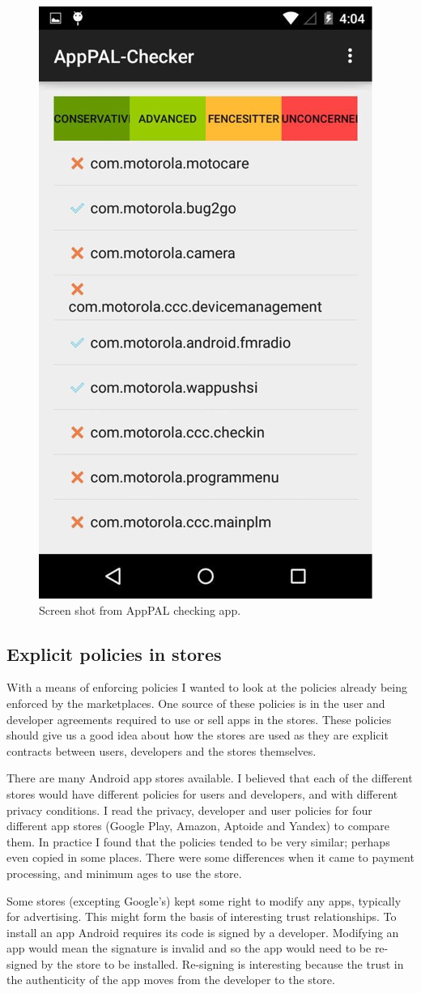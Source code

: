 \documentclass[a4paper]{scrartcl}
\begin{document}
\begin{figure}[]
  \centering
  \includegraphics[width=0.5\linewidth]{images/apppal-checker.png}
  \caption{Screen shot from AppPAL checking app.}
  \label{fig:checker}
\end{figure}
\subsection{Explicit policies in stores}

With a means of enforcing policies I wanted to look at the policies already being enforced by the marketplaces.
One source of these policies is in the user and developer agreements required to use or sell apps in the stores.
These policies should give us a good idea about how the stores are used as they are explicit contracts between users, developers and the stores themselves.

There are many Android app stores available.
I believed that each of the different stores would have different policies for users and developers, and with different privacy conditions.
I read the privacy, developer and user policies for four different app stores (Google Play, Amazon, Aptoide and Yandex) to compare them.
In practice I found that the policies tended to be very similar; perhaps even copied in some places.
There were some differences when it came to payment processing, and minimum ages to use the store.

Some stores (excepting Google's) kept some right to modify any apps, typically for advertising.
This might form the basis of interesting trust relationships.
To install an app Android requires its code is signed by a developer.
Modifying an app would mean the signature is invalid and so the app would need to be re-signed by the store to be installed.
Re-signing is interesting because the trust in the authenticity of the app moves from the developer to the store.
\end{document}

